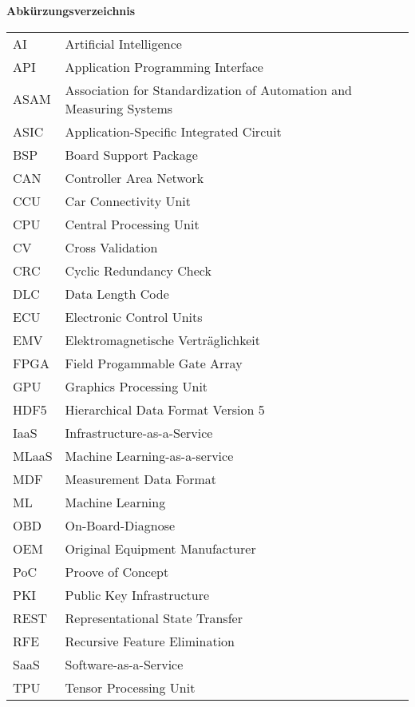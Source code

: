 %
%
%
%
%

\noindent
{\Large\bfseries Abkürzungsverzeichnis}
\vspace{0.65cm}

\begin{table*}[htbp]
    \begin{tabular}{ll}
        AI & Artificial Intelligence \\
        API & Application Programming Interface \\
        ASAM & Association for Standardization of Automation and Measuring Systems \\
        ASIC & Application-Specific Integrated Circuit \\
        BSP & Board Support Package \\
        CAN & Controller Area Network \\
        CCU & Car Connectivity Unit \\
        CPU & Central Processing Unit \\
        CV & Cross Validation \\
        CRC & Cyclic Redundancy Check \\
        DLC & Data Length Code \\
        ECU & Electronic Control Units \\
        EMV & Elektromagnetische Verträglichkeit \\
        FPGA & Field Progammable Gate Array \\
        GPU & Graphics Processing Unit \\
        HDF5 & Hierarchical Data Format Version 5 \\
        IaaS & Infrastructure-as-a-Service \\
        MLaaS & Machine Learning-as-a-service \\
        MDF & Measurement Data Format \\
        ML & Machine Learning \\
        OBD & On-Board-Diagnose \\
        OEM & Original Equipment Manufacturer \\
        PoC & Proove of Concept \\
        PKI & Public Key Infrastructure \\
        REST & Representational State Transfer \\
        RFE & Recursive Feature Elimination \\
        SaaS & Software-as-a-Service \\
        TPU & Tensor Processing Unit \\
    \end{tabular}
\end{table*}